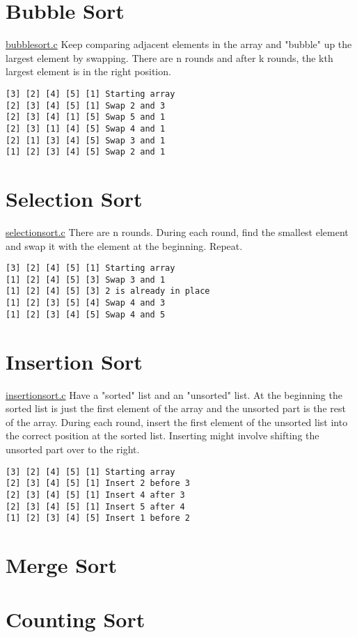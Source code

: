 \documentclass{article}
\begin{document}
\section{Bubble Sort}
\href{algos/bubblesort.c}{bubblesort.c}
Keep comparing adjacent elements in the array and "bubble" up the largest element by swapping.
There are n rounds and after k rounds, the kth largest element is in the right position.
\begin{lstlisting}
[3] [2] [4] [5] [1] Starting array
[2] [3] [4] [5] [1] Swap 2 and 3
[2] [3] [4] [1] [5] Swap 5 and 1
[2] [3] [1] [4] [5] Swap 4 and 1
[2] [1] [3] [4] [5] Swap 3 and 1
[1] [2] [3] [4] [5] Swap 2 and 1
\end{lstlisting}

\section{Selection Sort}
\href{algos/selectionsort.c}{selectionsort.c}
There are n rounds. During each round, find the smallest element and swap it with the element at the beginning. Repeat.
\begin{lstlisting}
[3] [2] [4] [5] [1] Starting array
[1] [2] [4] [5] [3] Swap 3 and 1
[1] [2] [4] [5] [3] 2 is already in place
[1] [2] [3] [5] [4] Swap 4 and 3
[1] [2] [3] [4] [5] Swap 4 and 5
\end{lstlisting}

\section{Insertion Sort}
\href{algos/insertionsort.c}{insertionsort.c}
Have a "sorted" list and an "unsorted" list.
At the beginning the sorted list is just the first element of the array and the unsorted part is the rest of the array.
During each round, insert the first element of the unsorted list into the correct position at the sorted list.
Inserting might involve shifting the unsorted part over to the right.
\begin{lstlisting}
[3] [2] [4] [5] [1] Starting array
[2] [3] [4] [5] [1] Insert 2 before 3
[2] [3] [4] [5] [1] Insert 4 after 3
[2] [3] [4] [5] [1] Insert 5 after 4
[1] [2] [3] [4] [5] Insert 1 before 2
\end{lstlisting}

\section{Merge Sort}
\section{Counting Sort}
\end{document}
